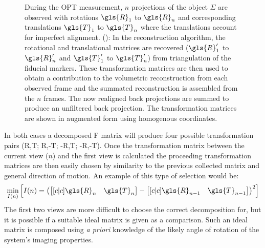 \documentclass{osa-article}
\begin{document}
\begin{figure}
{    During the \gls{OPT} measurement, \(n\) projections of the object \(\Sigma \) are observed with rotations \(\gls{R}_1\) to \(\gls{R}_n\) and corresponding translations \(\gls{T}_1\) to \(\gls{T}_n\) where the translations account for imperfect alignment.
    (): In the reconstruction algorithm, the rotational and translational matrices are recovered (\(\gls{R}_1'\) to \(\gls{R}_n'\) and \(\gls{T}_1'\) to \(\gls{T}_n'\)) from triangulation of the fiducial markers.
    These transformation matrices are then used to obtain a contribution to the volumetric reconstruction from each observed frame and the summated reconstruction is assembled from the \(n\) frames.
    The now realigned back projections are summed to produce an unfiltered back projection.
    The transformation matrices are shown in augmented form using homogenous coordinates.
    }\label{fig:flopt_algorithm} %
\end{figure}


In both cases a decomposed \gls{F} matrix will produce four possible transformation pairs (\gls{R},\gls{T}; \gls{R},-\gls{T}; -\gls{R},\gls{T}; -\gls{R},-\gls{T}). %
Once the transformation matrix between the current view (\(n\)) and the first view is calculated the proceeding transformation matrices are then easily chosen by similarity to the previous collected matrix and general direction of motion.
An example of this type of selection would be:
\begin{align}
\min_{I(n)}\left[I(n) = \left(\begin{bmatrix}[c|c] \gls{R}_n&\gls{T}_n \end{bmatrix} - \begin{bmatrix}[c|c] \gls{R}_{n-1}&\gls{T}_{n-1} \end{bmatrix}\right)^2\right]
\end{align}
The first two views are more difficult to choose the correct decomposition for, but it is possible if a suitable ideal matrix is given as a comparison. %
Such an ideal matrix is composed using \emph{a priori} knowledge of the likely angle of rotation of the system's imaging properties.
\end{document}
